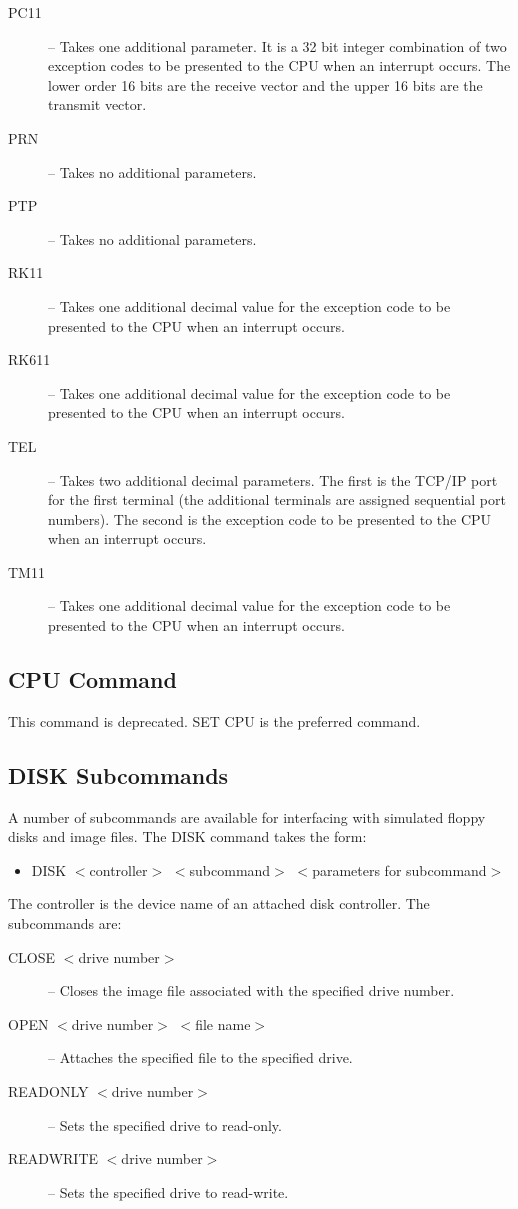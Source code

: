 \documentclass[10pt, openany]{book}
\begin{document}
\begin{description}
  \item[PC11] -- Takes one additional parameter.  It is a 32 bit integer combination of two exception codes to be presented to the CPU when an interrupt occurs.  The lower order 16 bits are the receive vector and the upper 16 bits are the transmit vector.
  \item[PRN] -- Takes no additional parameters.
  \item[PTP] -- Takes no additional parameters.
  \item[RK11] -- Takes one additional decimal value for the exception code to be presented to the CPU when an interrupt occurs.
  \item[RK611] -- Takes one additional decimal value for the exception code to be presented to the CPU when an interrupt occurs.
  \item[TEL] --  Takes two additional decimal parameters.  The first is the TCP/IP port for the first terminal (the additional terminals are assigned sequential port numbers).  The second is the exception code to be presented to the CPU when an interrupt occurs.
  \item[TM11] -- Takes one additional decimal value for the exception code to be presented to the CPU when an interrupt occurs.
\end{description}

\subsection{CPU Command}
This command is deprecated.  SET CPU is the preferred command.

\subsection{DISK Subcommands}
A number of subcommands are available for interfacing with simulated floppy disks and image files.
The DISK command takes the form:
\begin{itemize}
  \item DISK $<$controller$>$ $<$subcommand$>$ $<$parameters for subcommand$>$
\end{itemize}
The controller is the device name of an attached disk controller.  The subcommands are:
\begin{description}
  \item[CLOSE $<$drive number$>$] -- Closes the image file associated with the specified drive number.
  \item[OPEN $<$drive number$>$ $<$file name$>$] -- Attaches the specified file to the specified drive.
  \item[READONLY $<$drive number$>$] -- Sets the specified drive to read-only.
  \item[READWRITE $<$drive number$>$] -- Sets the specified drive to read-write.
\end{description}
\end{document}
